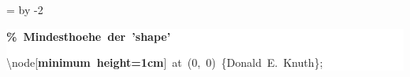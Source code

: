 \begingroup
\ttfamily
{}
=\textwidth
\advance{} by -2\fboxsep
\noindent
\colorbox{background}
{%
\parbox{\dimen255}
{%
\rule[-0.5ex]{0pt}{2.5ex}\hspace*{0.0em}\textcolor{G}{\textbf{\%~Mindesthoehe~der~'shape'}}\\
\rule[-0.5ex]{0pt}{2.5ex}\hspace*{0.0em}\textbackslash{}node[\textcolor{R}{\textbf{minimum~height=1cm}}]~at~(0,~0)~\{Donald~E.~Knuth\};}%
}%
\endgroup
